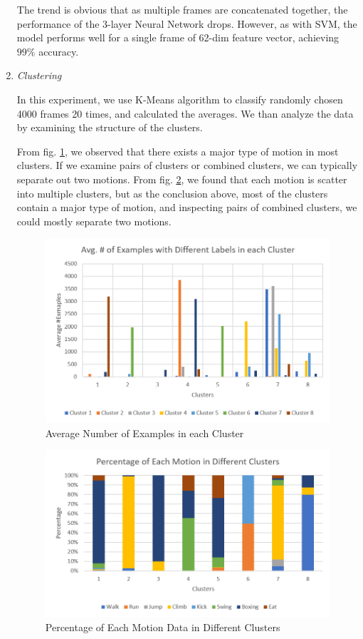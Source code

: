 \documentclass[letterpaper, 10pt, conference]{ieeeconf}
\begin{document}
\begin{enumerate}
The trend is obvious that as multiple frames are concatenated together, the performance of the 3-layer Neural Network drops. However, as with SVM, the model performs well for a single frame of 62-dim feature vector, achieving $99\%$ accuracy. \\

\item \textit{Clustering}

In this experiment, we use K-Means algorithm to classify randomly chosen 4000 frames 20 times, and calculated the averages. We than analyze the data by examining the structure of the clusters. 

From fig. \ref{fig:cluster1}, we observed that there exists a major type of motion in most clusters. If we examine pairs of clusters or combined clusters, we can typically separate out two motions. From fig. \ref{fig:cluster2}, we found that each motion is scatter into multiple clusters, but as the conclusion above, most of the clusters contain a major type of motion, and inspecting pairs of combined clusters, we could mostly separate two motions. 

\begin{figure}[h!]
    \centering
    \includegraphics[scale=0.4]{cluster1.png}
    \caption{Average Number of Examples in each Cluster}
    \label{fig:cluster1}
\end{figure}
\begin{figure}[h!]
    \centering
    \includegraphics[scale=0.4]{cluster2.png}
    \caption{Percentage of Each Motion Data in Different Clusters}
    \label{fig:cluster2}
\end{figure}

\end{enumerate}
\end{document}
